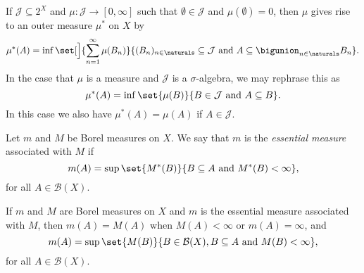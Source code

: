 \documentclass[article, a4paper, 11pt, oneside]{memoir}
\numberwithin{equation}{chapter}
\newcommand{\calB}{\mathcal{B}}
\newcommand{\borel}[1]{\calB(#1)}
\begin{document}
\newcommand{\calJ}{\mathcal{J}}
\newcommand{\powerset}[1]{2^{#1}}

If $\calJ \subseteq \powerset{X}$ and $\mu \colon \calJ \to [0,\infty]$ such that $\emptyset \in \calJ$ and $\mu(\emptyset) = 0$, then $\mu$ gives rise to an outer measure $\mu^*$ on $X$ by
%
\begin{equation*}
    \mu^*(A)
        = \inf \set[\Big]{
            \sum_{n=1}^\infty \mu(B_n)
        }{
            (B_n)_{n \in \naturals} \subseteq \calJ
            \text{ and }
            A \subseteq \bigunion_{n \in \naturals} B_n
        }.
\end{equation*}
%
In the case that $\mu$ is a measure and $\calJ$ is a $\sigma$-algebra, we may rephrase this as
%
\begin{equation*}
    \mu^*(A)
        = \inf \set{
            \mu(B)
        }{
            B \in \calJ
            \text{ and }
            A \subseteq B
        }.
\end{equation*}
%
In this case we also have $\mu^*(A) = \mu(A)$ if $A \in \calJ$.

\begin{definition}
    Let $m$ and $M$ be Borel measures on $X$. We say that $m$ is the \emph{essential measure} associated with $M$ if
    \begin{equation*}
        m(A)
            = \sup \set{ M^*(B) }{ B \subseteq A \text{ and } M^*(B) < \infty },
    \end{equation*}
    for all $A \in \borel{X}$.
\end{definition}


\begin{lemma}
    \label{thm:essential-measure-equivalent-formula}
    If $m$ and $M$ are Borel measures on $X$ and $m$ is the essential measure associated with $M$, then $m(A) = M(A)$ when $M(A) < \infty$ or $m(A) = \infty$, and
    \begin{equation}
        \label{eq:essential-measure-equivalent-formula}
        m(A)
            = \sup \set{ M(B) }{ B \in \borel{X}, B \subseteq A \text{ and } M(B) < \infty },
    \end{equation}
    for all $A \in \borel{X}$.
\end{lemma}
\end{document}
